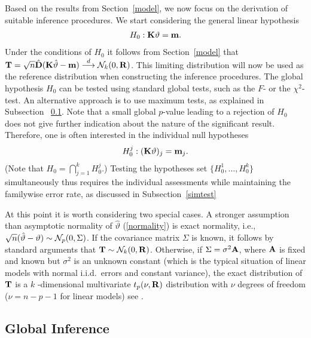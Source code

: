 \documentclass[12pt]{article}
\begin{document}
\label{siminf}

Based on the results from Section~\ref{model}, we now focus on the
derivation of suitable inference procedures. We start considering the
general linear hypothesis \citep{Searle1971} 
\begin{eqnarray*}
H_0: \mathbf{K} \vartheta = \mathbf{m}.
\end{eqnarray*}
Under the conditions of $H_0$ it follows from Section~\ref{model} that $\mathbf{T} = 
\sqrt{n} \hat{\mathbf{D}} (\mathbf{K} \hat{\vartheta} - \mathbf{m}) \stackrel{d}{\longrightarrow} \mathcal{N}_k(0, \mathbf{R})$. This
limiting distribution will now be used as the reference distribution when
constructing the inference procedures. The global hypothesis $H_0$ can be
tested using standard global tests, such as the $F$- or the $\chi^2$-test.
An alternative approach is to use maximum tests, as explained in Subsection~%
\ref{global}. Note that a small global $p$-value leading to a rejection of $%
H_0$ does not give further indication about the nature of the significant
result. Therefore, one is often interested in the individual null hypotheses 
\begin{eqnarray*}
H_0^j: (\mathbf{K}\vartheta)_j = \mathbf{m}_j.
\end{eqnarray*}
(Note that $H_0 = \bigcap_{j = 1}^k H_0^j$.) Testing the hypotheses set $%
\{H_0^1, \ldots, H_0^k\}$ simultaneously thus requires the individual
assessments while maintaining the familywise error rate, as discussed in
Subsection~\ref{simtest}

At this point it is worth considering two special cases. A stronger
assumption than asymptotic normality of $\hat{\vartheta}$ (\ref{normality})
is exact normality, i.e., $\sqrt{n} (\hat{\vartheta} - \vartheta) \sim \N%
_p(0, \Sigma)$. If the covariance matrix $\Sigma$ is known, it follows by
standard arguments that $\mathbf{T} \sim \mathcal{N}_k(0, \mathbf{R})$. Otherwise, if $\Sigma =
\sigma^2 \mathbf{A}$, where $\mathbf{A}$ is fixed and known but $\sigma^2$ is an unknown
constant (which is the typical situation of linear models with normal
i.i.d.~errors and constant variance), the exact distribution of $\mathbf{T}$ is a $k$%
-dimensional multivariate $t_p(\nu, \mathbf{R})$ distribution with $\nu$ degrees
of freedom ($\nu = n - p - 1$ for linear models) see \citep{Tong1990}.

\subsection{Global Inference}

\label{global} %
\end{document}
